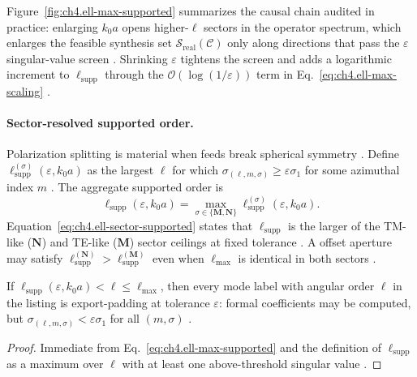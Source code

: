 Figure~\ref{fig:ch4.ell-max-supported} summarizes the causal chain audited in practice: enlarging \(k_{0}a\) opens higher-\(\ell\)
sectors in the operator spectrum, which enlarges the feasible synthesis set \(\mathcal{S}_{\mathrm{real}}(\mathcal{C})\) only along
directions that pass the \(\varepsilon\) singular-value screen \cite{harrington2001,devaney2004}. Shrinking \(\varepsilon\) tightens
the screen and adds a logarithmic increment to \(\ell_{\mathrm{supp}}\) through the \(\mathcal{O}(\log(1/\varepsilon))\) term in
Eq.~\eqref{eq:ch4.ell-max-scaling} \cite{hansen1988,jackson1999}.

\paragraph{Sector-resolved supported order.}
Polarization splitting is material when feeds break spherical symmetry \cite{harrington2001,collin2001}. Define
\(\ell_{\mathrm{supp}}^{(\sigma)}(\varepsilon,k_{0}a)\) as the largest \(\ell\) for which
\(\sigma_{(\ell,m,\sigma)}\ge\varepsilon\sigma_{1}\) for some azimuthal index \(m\) \cite{hansen1988,stratton1941}. The aggregate
supported order is
\begin{equation}
\label{eq:ch4.ell-sector-supported}
\ell_{\mathrm{supp}}(\varepsilon,k_{0}a)
=
\max_{\sigma\in\{\mathbf{M},\mathbf{N}\}}
\ell_{\mathrm{supp}}^{(\sigma)}(\varepsilon,k_{0}a).
\end{equation}
Equation~\eqref{eq:ch4.ell-sector-supported} states that \(\ell_{\mathrm{supp}}\) is the larger of the TM-like (\(\mathbf{N}\)) and
TE-like (\(\mathbf{M}\)) sector ceilings at fixed tolerance \cite{harrington2001,jackson1999}. A offset aperture may satisfy
\(\ell_{\mathrm{supp}}^{(\mathbf{N})}>\ell_{\mathrm{supp}}^{(\mathbf{M})}\) even when \(\ell_{\max}\) is identical in both sectors
\cite{collin2001,devaney2004}.

\begin{corollary}
\label{cor:ch4.listing-vs-supported}
If \(\ell_{\mathrm{supp}}(\varepsilon,k_{0}a)<\ell\le\ell_{\max}\), then every mode label with angular order \(\ell\) in the listing
is export-padding at tolerance \(\varepsilon\): formal coefficients may be computed, but
\(\sigma_{(\ell,m,\sigma)}<\varepsilon\sigma_{1}\) for all \((m,\sigma)\) \cite{hansen1988,harrington2001,devaney2004}.
\end{corollary}
\begin{proof}
Immediate from Eq.~\eqref{eq:ch4.ell-max-supported} and the definition of \(\ell_{\mathrm{supp}}\) as a maximum over \(\ell\)
with at least one above-threshold singular value \cite{hansen1988,stratton1941}.
\end{proof}

